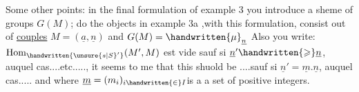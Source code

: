 Some other points: in the final formulation of example 3 you introduce a sheme of groups $G(M)$;  do the objects in example 3a ,with this formulation, consist out of \uline{couples} $M=(\underline{a},\underline{n})$ and $G(M)=\handwritten{\mu}_{\underline{n}}$  Also you write: $\mathrm{Hom}_{\handwritten{\unsure{s|S}'}}(M',M)$ est vide sauf si $\underline{n}'\handwritten{\geqslant}\underline{n}$, auquel cas....etc....., it seems to me that this shuold be ....sauf si $\underline{n}'=\underline{m}.\underline{n}$, auquel cas..... and where $\underline{m}=(m_i)_{i\handwritten{\in}I}$is a a set of positive integers.

